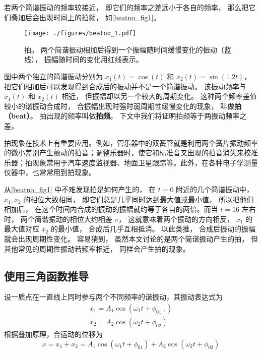 

若两个简谐振动的频率较接近， 即它们的频率之差远小于各自的频率， 那么把它们叠加后会出现时间上的拍频， 如\autoref{beatno_fig1}。
\begin{figure}[ht]
\centering
\texttt{[image: ./figures/beatno\_1.pdf]}
\caption{拍。 两个简谐振动相加后得到一个振幅随时间缓慢变化的振动（蓝线）， 振幅随时间的变化用红线表示。} \label{beatno_fig1}
\end{figure}
图中两个独立的简谐振动分别为 $x_1(t) = \cos(t)$ 和 $x_2(t) = \sin(1.2t)$， 把它们相加后可以发现得到合成后的振动并不是一个简谐振动。 该振动频率与 $x_1(t)$ 和 $x_2(t)$ 相近， 但振幅却以另一个较大的周期变化。 这种两个频率差值较小的谐振动合成时， 合振幅出现时强时弱周期性缓慢变化的现象， 叫做\textbf{拍（beat）}。 拍出现的频率叫做\textbf{拍频}。 下文中我们将证明拍频等于两振动频率之差。

拍现象在技术上有重要应用。例如，管乐器中的双簧管就是利用两个簧片振动频率的微小差别产生颤动的拍音；调整乐器时，使它和标准音叉出现的拍音消失来校准乐器；拍现象常用于汽车速度监视器、地面卫星跟踪等。此外，在各种电子学测量仪器中，也常常用到拍现象。

从\autoref{beatno_fig1} 中不难发现拍是如何产生的， 在 $t = 0$ 附近的几个简谐振动中， $x_1, x_2$ 的相位大致相同， 即它们总是几乎同时达到最大值或最小值， 所以把他们相加后， 在这个时间内合成的振动的振幅就约等于各自的两倍。而当 $t = 16$ 左右时， 两个简谐振动的相位大约相差 $\pi$， 这就意味着两个振动的方向相反， $x_1$ 的最大值对应 $x_2$ 的最小值， 合成后几乎互相抵消。 以此类推， 合成后振动的振幅就会出现周期性变化。
容易猜到， 虽然本文讨论的是两个简谐振动产生的拍， 但其他常见的周期性振动若频率相近， 同样会产生拍的现象。

\subsection{使用三角函数推导}
设一质点在一直线上同时参与两个不同频率的谐振动，其振动表达式为
\begin{equation}
\begin{array}{l}x_{1}=A_{1} \cos \left(\omega_{1} t+\phi_{01}~,\right) \\ x_{2}=A_{2} \cos \left(\omega_{2} t+\phi_{02}\right)\end{array}
\end{equation}
根据叠加原理，合运动的位移为
\begin{equation}
x=x_{1}+x_{2}=A_{1} \cos \left(\omega_{1} t+\phi_{01}\right)+A_{2} \cos \left(\omega_{2} t+\phi_{02}\right)
\end{equation}

